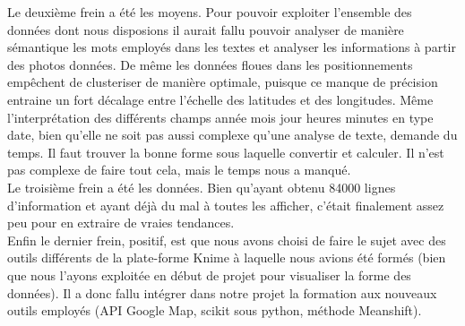 Le deuxième frein a été les moyens. Pour pouvoir exploiter l'ensemble des données dont nous disposions il aurait fallu pouvoir analyser de manière sémantique les mots employés dans les textes et analyser les informations à partir des photos données. De même les données floues dans les positionnements empêchent de clusteriser de manière optimale, puisque ce manque de précision entraine un fort décalage entre l'échelle des latitudes et des longitudes. Même l'interprétation des différents champs année mois jour heures minutes en type date, bien qu'elle ne soit pas aussi complexe qu'une analyse de texte, demande du temps. Il faut trouver la bonne forme sous laquelle convertir et calculer.
Il n'est pas complexe de faire tout cela, mais le temps nous a manqué.
\\

Le troisième frein a été les données. Bien qu'ayant obtenu 84000 lignes d'information et ayant déjà du mal à toutes les afficher, c'était finalement assez peu pour en extraire de vraies tendances.
\\

Enfin le dernier frein, positif, est que nous avons choisi de faire le sujet avec des outils différents de la plate-forme Knime à laquelle nous avions été formés (bien que nous l'ayons exploitée en début de projet pour visualiser la forme des données). Il a donc fallu intégrer dans notre projet la formation aux nouveaux outils employés (API Google Map, scikit sous python, méthode Meanshift).

